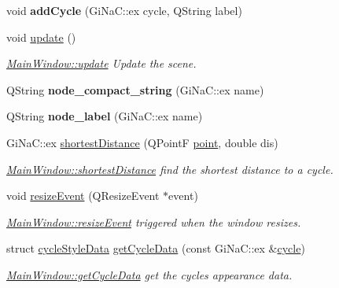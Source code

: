 \begin{DoxyCompactItemize}
\mbox{\label{class_main_window_a00432086a975b242f76384601785bfcb}} 
void {\bfseries add\+Cycle} (Gi\+Na\+C\+::ex cycle, Q\+String label)
\item 
void \mbox{\hyperlink{class_main_window_a128f71880d4b9683149023fc46fcc9f8}{update}} ()
\begin{DoxyCompactList}\small\item\em \mbox{\hyperlink{class_main_window_a128f71880d4b9683149023fc46fcc9f8}{Main\+Window\+::update}} Update the scene. \end{DoxyCompactList}\item 
\mbox{\label{class_main_window_a824f237890279ea706b827422f47ae4a}} 
Q\+String {\bfseries node\+\_\+compact\+\_\+string} (Gi\+Na\+C\+::ex name)
\item 
\mbox{\label{class_main_window_a989b1d1dcf93a3441027f4cd49bf28a5}} 
Q\+String {\bfseries node\+\_\+label} (Gi\+Na\+C\+::ex name)
\item 
Gi\+Na\+C\+::ex \mbox{\hyperlink{class_main_window_a2431b3144405d8d0d3e8bd3523ad381b}{shortest\+Distance}} (Q\+PointF \mbox{\hyperlink{classpoint}{point}}, double dis)
\begin{DoxyCompactList}\small\item\em \mbox{\hyperlink{class_main_window_a2431b3144405d8d0d3e8bd3523ad381b}{Main\+Window\+::shortest\+Distance}} find the shortest distance to a cycle. \end{DoxyCompactList}\item 
void \mbox{\hyperlink{class_main_window_ae12f8f63791595567b6250f8bb002bda}{resize\+Event}} (Q\+Resize\+Event $\ast$event)
\begin{DoxyCompactList}\small\item\em \mbox{\hyperlink{class_main_window_ae12f8f63791595567b6250f8bb002bda}{Main\+Window\+::resize\+Event}} triggered when the window resizes. \end{DoxyCompactList}\item 
struct \mbox{\hyperlink{structcycle_style_data}{cycle\+Style\+Data}} \mbox{\hyperlink{class_main_window_a3088b7addf938e91e77b741a9ae22a53}{get\+Cycle\+Data}} (const Gi\+Na\+C\+::ex \&\mbox{\hyperlink{class_moeb_inv_1_1cycle}{cycle}})
\begin{DoxyCompactList}\small\item\em \mbox{\hyperlink{class_main_window_a3088b7addf938e91e77b741a9ae22a53}{Main\+Window\+::get\+Cycle\+Data}} get the cycles appearance data. \end{DoxyCompactList}\item 

\end{DoxyCompactItemize}
